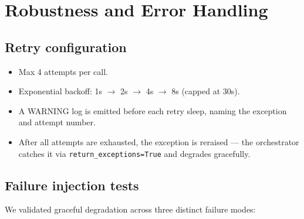 \documentclass[12pt,a4paper]{article}
\begin{document}
\section{Robustness and Error Handling}

\subsection{Retry configuration}

\begin{itemize}
  \item Max 4 attempts per call.
  \item Exponential backoff: 1s $\to$ 2s $\to$ 4s $\to$ 8s (capped at 30s).
  \item A WARNING log is emitted before each retry sleep, naming the exception and attempt number.
  \item After all attempts are exhausted, the exception is reraised — the orchestrator catches
    it via \texttt{return\_exceptions=True} and degrades gracefully.
\end{itemize}

\subsection{Failure injection tests}

We validated graceful degradation across three distinct failure modes:
\end{document}
